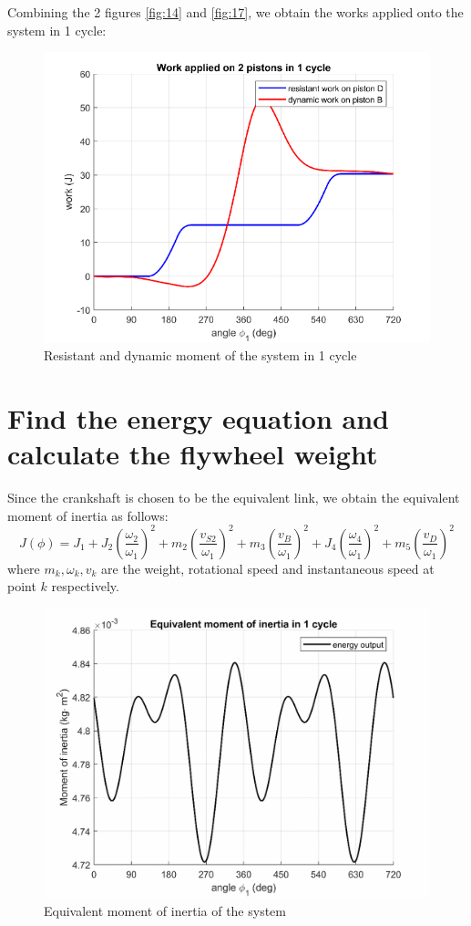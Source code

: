 Combining the 2 figures \ref{fig:14} and \ref{fig:17}, we obtain the works applied onto the system in 1 cycle:
\begin{figure}
	\centering
	\includegraphics[width=0.6\linewidth]{18}
	\caption{Resistant and dynamic moment of the system in 1 cycle}
	\label{fig:18}
\end{figure}
\section{Find the energy equation and calculate the flywheel weight}
Since the crankshaft is chosen to be the equivalent link, we obtain the equivalent moment of inertia as follows:
\begin{equation}
	J(\phi)=J_1+J_2\left(\dfrac{\omega_2}{\omega_1}\right)^2+m_2\left(\dfrac{v_{S2}}{\omega_1}\right)^2+m_3\left(\dfrac{v_{B}}{\omega_1}\right)^2+J_4\left(\dfrac{\omega_4}{\omega_1}\right)^2+m_5\left(\dfrac{v_{D}}{\omega_1}\right)^2
\end{equation}
where $ m_k,\omega_k,v_k $ are the weight, rotational speed and instantaneous speed at point $ k $ respectively.
\begin{figure}[h]
	\centering
	\includegraphics[width=0.6\linewidth]{19}
	\caption{Equivalent moment of inertia of the system}
	\label{fig:19}
\end{figure}

